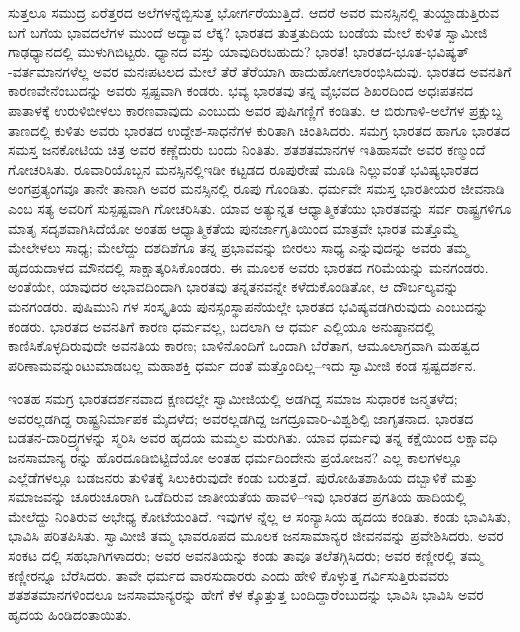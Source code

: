 ಸುತ್ತಲೂ ಸಮುದ್ರ ಏರೆತ್ತರದ ಅಲೆಗಳನ್ನೆಬ್ಬಿಸುತ್ತ ಭೋರ್ಗರೆಯುತ್ತಿದೆ. ಆದರೆ ಅವರ ಮನಸ್ಸಿನಲ್ಲಿ ತುಯ್ದಾಡುತ್ತಿರುವ ಬಗೆ ಬಗೆಯ ಭಾವದಲೆಗಳ ಮುಂದೆ ಅದ್ಯಾವ ಲೆಕ್ಕ? ಭಾರತದ ತುತ್ತತುದಿಯ ಬಂಡೆಯ ಮೇಲೆ ಕುಳಿತ ಸ್ವಾಮೀಜಿ ಗಾಢಧ್ಯಾನದಲ್ಲಿ ಮುಳುಗಿಬಿಟ್ಟರು. ಧ್ಯಾನದ ವಸ್ತು ಯಾವುದಿರಬಹುದು? ಭಾರತ! ಭಾರತದ-ಭೂತ-ಭವಿಷ್ಯತ್​-ವರ್ತಮಾನಗಳೆಲ್ಲ ಅವರ ಮನಃಪಟಲದ ಮೇಲೆ ತೆರೆ ತೆರೆಯಾಗಿ ಹಾದುಹೋಗಲಾರಂಭಿಸಿದುವು. ಭಾರತದ ಅವನತಿಗೆ ಕಾರಣವೇನೆಂಬುದನ್ನು ಅವರು ಸ್ಪಷ್ಟವಾಗಿ ಕಂಡರು. ಭವ್ಯ ಭಾರತವು ತನ್ನ ವೈಭವದ ಶಿಖರದಿಂದ ಅಧಃಪತನದ ಪಾತಾಳಕ್ಕೆ ಉರುಳಿಬೀಳಲು ಕಾರಣವಾವುದು ಎಂಬುದು ಅವರ ಪುಷಿಗಣ್ಣಿಗೆ ಕಂಡಿತು. ಆ ಬಿರುಗಾಳಿ-ಅಲೆಗಳ ಪ್ರಕ್ಷುಬ್ದ ತಾಣದಲ್ಲಿ ಕುಳಿತು ಅವರು ಭಾರತದ ಉದ್ದೇಶ-ಸಾಧನೆಗಳ ಕುರಿತಾಗಿ ಚಿಂತಿಸಿದರು. ಸಮಗ್ರ ಭಾರತದ ಹಾಗೂ ಭಾರತದ ಸಮಸ್ತ ಜನಕೋಟಿಯ ಚಿತ್ರ ಅವರ ಕಣ್ಣೆದುರು ಬಂದು ನಿಂತಿತು. ಶತಶತಮಾನಗಳ ಇತಿಹಾಸವೇ ಅವರ ಕಣ್ಮುಂದೆ ಗೋಚರಿಸಿತು. ರೂವಾರಿಯೊಬ್ಬನ ಮನಸ್ಸಿನಲ್ಲಿಇಡೀ ಕಟ್ಟಡದ ರೂಪುರೇಷೆ ಮೂಡಿ ನಿಲ್ಲುವಂತೆ ಭವಿಷ್ಯಭಾರತದ ಅಂಗಪ್ರತ್ಯಂಗವೂ ತಾನೇ ತಾನಾಗಿ ಅವರ ಮನಸ್ಸಿನಲ್ಲಿ ರೂಪು ಗೊಂಡಿತು. ಧರ್ಮವೇ ಸಮಸ್ತ ಭಾರತೀಯರ ಜೀವನಾಡಿ ಎಂಬ ಸತ್ಯ ಅವರಿಗೆ ಸುಸ್ಪಷ್ಟವಾಗಿ ಗೋಚರಿಸಿತು. ಯಾವ ಅತ್ಯುನ್ನತ ಆಧ್ಯಾತ್ಮಿಕತೆಯು ಭಾರತವನ್ನು ಸರ್ವ ರಾಷ್ಟ್ರಗಳಿಗೂ ಮಾತೃ ಸದೃಶವಾಗಿಸಿದೆಯೋ ಅಂತಹ ಆಧ್ಯಾತ್ಮಿಕತೆಯ ಪುನರ್ಜಾಗೃತಿಯಿಂದ ಮಾತ್ರವೇ ಭಾರತ ಮತ್ತೊಮ್ಮೆ ಮೇಲೇಳಲು ಸಾಧ್ಯ; ಮೇಲೆದ್ದು ದಶದಿಶೆಗೂ ತನ್ನ ಪ್ರಭಾವವನ್ನು ಬೀರಲು ಸಾಧ್ಯ ಎನ್ನುವುದನ್ನು ಅವರು ತಮ್ಮ ಹೃದಯದಾಳದ ಮೌನದಲ್ಲಿ ಸಾಕ್ಷಾತ್ಕರಿಸಿಕೊಂಡರು. ಈ ಮೂಲಕ ಅವರು ಭಾರತದ ಗರಿಮೆಯನ್ನು ಮನಗಂಡರು. ಅಂತೆಯೇ, ಯಾವುದರ ಅಭಾವದಿಂದಾಗಿ ಭಾರತವು ತನ್ನತನವನ್ನೇ ಕಳೆದುಕೊಂಡಿತೋ, ಆ ದೌರ್ಬಲ್ಯವನ್ನು ಮನಗಂಡರು. ಪುಷಿಮುನಿ ಗಳ ಸಂಸ್ಕೃತಿಯ ಪುನಸ್ಸಂಸ್ಥಾಪನೆಯಲ್ಲೇ ಭಾರತದ ಭವಿಷ್ಯವಡಗಿರುವುದು ಎಂಬುದನ್ನು ಕಂಡರು. ಭಾರತದ ಅವನತಿಗೆ ಕಾರಣ ಧರ್ಮವಲ್ಲ, ಬದಲಾಗಿ ಆ ಧರ್ಮ ಎಲ್ಲಿಯೂ ಅನುಷ್ಠಾನದಲ್ಲಿ ಕಾಣಿಸಿಕೊಳ್ಳದಿರುವುದೇ ಅವನತಿಯ ಕಾರಣ; ಬಾಳಿನೊಂದಿಗೆ ಒಂದಾಗಿ ಬೆರೆತಾಗ, ಆಮೂಲಾಗ್ರವಾಗಿ ಮಹತ್ವದ ಪರಿಣಾಮವನ್ನುಂಟುಮಾಡಬಲ್ಲ ಮಹಾಶಕ್ತಿ ಧರ್ಮ ದಂತೆ ಮತ್ತೊಂದಿಲ್ಲ–ಇದು ಸ್ವಾಮೀಜಿ ಕಂಡ ಸ್ಪಷ್ಟದರ್ಶನ.

ಇಂತಹ ಸಮಗ್ರ ಭಾರತದರ್ಶನವಾದ ಕ್ಷಣದಲ್ಲೇ ಸ್ವಾಮೀಜಿಯಲ್ಲಿ ಅಡಗಿದ್ದ ಸಮಾಜ ಸುಧಾರಕ ಜನ್ಮತಳೆದ; ಅವರಲ್ಲಡಗಿದ್ದ ರಾಷ್ಟ್ರನಿರ್ಮಾಪಕ ಮೈದಳೆದ; ಅವರಲ್ಲಡಗಿದ್ದ ಜಗದ್ರೂವಾರಿ-ವಿಶ್ವಶಿಲ್ಪಿ ಜಾಗೃತನಾದ. ಭಾರತದ ಬಡತನ-ದಾರಿದ್ರ್ಯಗಳನ್ನು ಸ್ಮರಿಸಿ ಅವರ ಹೃದಯ ಮಮ್ಮಲ ಮರುಗಿತು. ಯಾವ ಧರ್ಮವು ತನ್ನ ಕಕ್ಷೆಯಿಂದ ಲಕ್ಷಾವಧಿ ಜನಸಾಮಾನ್ಯ ರನ್ನು ಹೊರದೂಡಿಬಿಟ್ಟಿದೆಯೋ ಅಂತಹ ಧರ್ಮದಿಂದೇನು ಪ್ರಯೋಜನ? ಎಲ್ಲ ಕಾಲಗಳಲ್ಲೂ ಎಲ್ಲೆಡೆಗಳಲ್ಲೂ ಬಡಜನರು ತುಳಿತಕ್ಕೆ ಸಿಲುಕಿರುವುದೇ ಕಂಡು ಬರುತ್ತದೆ. ಪುರೋಹಿತಶಾಹಿಯ ದಬ್ಬಾಳಿಕೆ ಮತ್ತು ಸಮಾಜವನ್ನು ಚೂರುಚೂರಾಗಿ ಒಡೆದಿರುವ ಜಾತೀಯತೆಯ ಹಾವಳಿ–ಇವು ಭಾರತದ ಪ್ರಗತಿಯ ಹಾದಿಯಲ್ಲಿ ಮೇಲೆದ್ದು ನಿಂತಿರುವ ಅಭೇಧ್ಯ ಕೋಟೆಯಂತಿದೆ. ಇವುಗಳ ನ್ನೆಲ್ಲ ಆ ಸಂನ್ಯಾಸಿಯ ಹೃದಯ ಕಂಡಿತು. ಕಂಡು ಭಾವಿಸಿತು, ಭಾವಿಸಿ ಪರಿತಪಿಸಿತು. ಸ್ವಾಮೀಜಿ ತಮ್ಮ ಭಾವರೂಪದ ಮೂಲಕ ಜನಸಾಮಾನ್ಯರ ಜೀವನವನ್ನು ಪ್ರವೇಶಿಸಿದರು. ಅವರ ಸಂಕಟ ದಲ್ಲಿ ಸಹಭಾಗಿಗಳಾದರು; ಅವರ ಅವನತಿಯನ್ನು ಕಂಡು ತಾವೂ ತಲೆತಗ್ಗಿಸಿದರು; ಅವರ ಕಣ್ಣೀರಲ್ಲಿ ತಮ್ಮ ಕಣ್ಣೀರನ್ನೂ ಬೆರೆಸಿದರು. ತಾವೇ ಧರ್ಮದ ವಾರಸುದಾರರು ಎಂದು ಹೇಳಿ ಕೊಳ್ಳುತ್ತ ಗರ್ವಿಸುತ್ತಿರುವವರು ಶತಶತಮಾನಗಳಿಂದಲೂ ಜನಸಾಮಾನ್ಯರನ್ನು ಹೇಗೆ ಕೆಳ ಕ್ಕೊತ್ತುತ್ತ ಬಂದಿದ್ದಾರೆಂಬುದನ್ನು ಭಾವಿಸಿ ಭಾವಿಸಿ ಅವರ ಹೃದಯ ಹಿಂಡಿದಂತಾಯಿತು.

